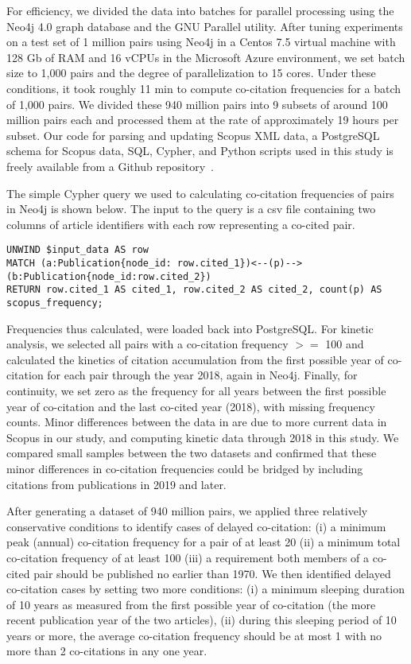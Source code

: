 \documentclass[utf8]{frontiersSCNS}
\begin{document}
For efficiency, we divided the data into batches for parallel processing using the Neo4j 4.0 graph database and the GNU Parallel utility.  After tuning experiments on a test set of 1 million pairs using Neo4j in a Centos 7.5 virtual machine with 128 Gb of RAM and 16 vCPUs in the Microsoft Azure environment, we set batch size to 1,000 pairs and the degree of parallelization to 15 cores. Under these conditions, it took roughly 11 min to compute co-citation frequencies for a batch of 1,000 pairs. We divided these 940 million pairs into 9 subsets of around 100 million pairs each and processed them at the rate of approximately 19 hours per subset. Our code for parsing and updating Scopus XML data, a PostgreSQL schema for Scopus data, SQL, Cypher, and Python scripts used in this study is freely available from a Github repository~\citep{Korobskiy2019}.   

The simple Cypher query we used to calculating co-citation frequencies of pairs in Neo4j is shown below. The input to the query is a csv file containing two columns of article identifiers with each row representing a co-cited pair.  
\vspace{2 mm}
\lstset{language=Pascal, basicstyle=\footnotesize} 
\begin{lstlisting}[frame=single]
UNWIND $input_data AS row
MATCH (a:Publication{node_id: row.cited_1})<--(p)-->(b:Publication{node_id:row.cited_2})
RETURN row.cited_1 AS cited_1, row.cited_2 AS cited_2, count(p) AS scopus_frequency;
\end{lstlisting}

Frequencies thus calculated, were loaded back into PostgreSQL. For kinetic analysis, we selected all pairs with a co-citation frequency $>=$ 100 and calculated the kinetics of citation accumulation from the first possible year of co-citation for each pair through the year 2018, again in Neo4j.  Finally, for continuity, we set zero as the frequency for all years between the first possible year of co-citation and the last co-cited year (2018), with  missing frequency counts. Minor differences between the data in  \cite{devarakonda_2020} are due to more current data in Scopus in our study, and computing kinetic data through 2018 in this study. We compared small samples between the two datasets and confirmed that these minor differences in co-citation frequencies could be bridged by including citations from publications in 2019 and later. 

After generating a dataset of 940 million pairs, we applied three relatively conservative conditions to identify cases of delayed co-citation: (i) a minimum peak (annual) co-citation frequency for a pair of at least 20 (ii) a minimum total co-citation frequency of at least 100 (iii) a requirement both members of a co-cited pair should be published no earlier than 1970. We then identified delayed co-citation cases by setting two more conditions: (i) a minimum sleeping duration of 10 years as measured from the first possible year of co-citation (the more recent publication year of the two articles), (ii) during this sleeping period of 10 years or more, the average co-citation frequency should be at most 1 with no more than 2 co-citations in any one year. 
\end{document}
